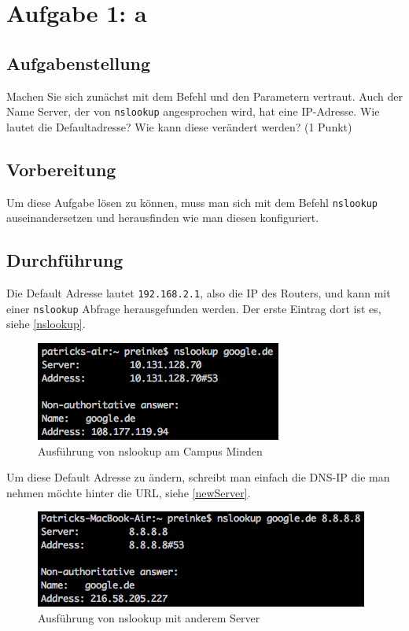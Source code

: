 \newpage
\section{Aufgabe 1: a}

\subsection{Aufgabenstellung}
Machen Sie sich zunächst mit dem Befehl und den Parametern vertraut. Auch der Name Server, der von \texttt{nslookup} angesprochen wird, hat eine IP-Adresse. Wie lautet die Defaultadresse? Wie kann diese verändert werden? (1 Punkt)

\subsection{Vorbereitung}
Um diese Aufgabe lösen zu können, muss man sich mit dem Befehl \texttt{nslookup} auseinandersetzen und herausfinden wie man diesen konfiguriert. 

\subsection{Durchführung}
Die Default Adresse lautet \texttt{192.168.2.1}, also die IP des Routers, und kann mit einer \texttt{nslookup} Abfrage herausgefunden werden. Der erste Eintrag dort ist es, siehe \autoref{nslookup}.

\begin{figure}[H]
	\centering
	\includegraphics[width=0.4 \linewidth]{images/11}
	\caption{Ausführung von nslookup am Campus Minden} \label{nslookup}
\end{figure}

Um diese Default Adresse zu ändern, schreibt man einfach die DNS-IP die man nehmen möchte hinter die URL, siehe \autoref{newServer}.

\begin{figure}[H]
	\centering
	\includegraphics[width=0.4 \linewidth]{images/12}
	\caption{Ausführung von nslookup mit anderem Server}\label{newServer}
\end{figure}

